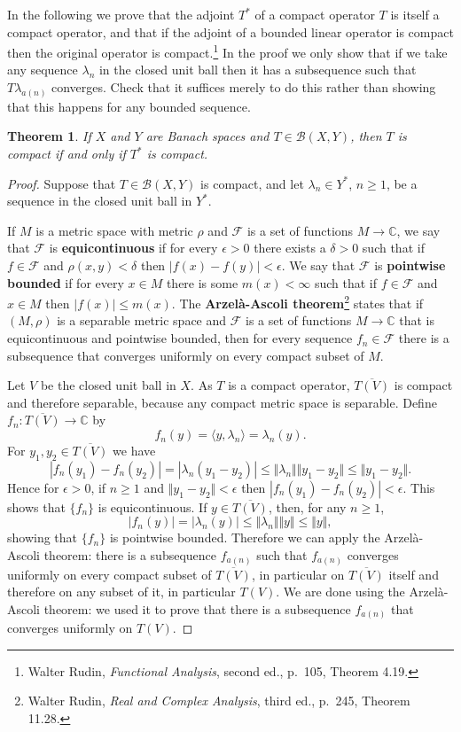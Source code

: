 \documentclass{article}
\newcommand{\inner}[2]{\langle #1, #2 \rangle}
\newcommand{\norm}[1]{\Vert #1 \Vert}
\newtheorem{theorem}{Theorem}
\begin{document}
In the following we prove that the adjoint $T^*$ of a compact operator $T$ is itself a compact operator,
and that if the adjoint of a bounded linear operator is compact then the original operator  is compact.\footnote{Walter Rudin, {\em Functional Analysis}, second ed., p.~105, Theorem 4.19.}
In the proof we only show that if we take any sequence $\lambda_n$ in the closed unit ball then it has a subsequence such that
$T\lambda_{a(n)}$ converges. Check that it suffices merely to do this rather than showing that this happens for any bounded sequence.

\begin{theorem}
If $X$ and $Y$ are Banach spaces and $T \in \mathscr{B}(X,Y)$, then $T$ is compact if and only if
$T^*$ is compact.
\label{adjointcompact}
\end{theorem}
\begin{proof}
Suppose that $T \in \mathscr{B}(X,Y)$ is compact, and let $\lambda_n \in Y^*$, $n \geq 1$, be a sequence in the closed unit ball in $Y^*$.

If $M$ is a metric space with metric $\rho$ and $\mathcal{F}$ is a set of functions $M \to \mathbb{C}$,
we say that $\mathcal{F}$ is \textbf{equicontinuous} if for every $\epsilon>0$ there exists a $\delta>0$ such that
if $f \in \mathcal{F}$ and $\rho(x,y)<\delta$ then $|f(x)-f(y)|<\epsilon$.
We say that $\mathcal{F}$ is \textbf{pointwise bounded} if for every $x \in M$ there is some $m(x)<\infty$ such that
if $f \in \mathcal{F}$ and $x \in M$ then $|f(x)| \leq m(x)$.
The \textbf{Arzel\`a-Ascoli theorem}\footnote{Walter Rudin, {\em Real and Complex Analysis}, third ed., p.~245, Theorem 11.28.}
 states that if $(M,\rho)$ is a separable metric space and $\mathcal{F}$ is a set of functions $M \to \mathbb{C}$ that is equicontinuous and pointwise bounded,
then for every sequence $f_n \in \mathcal{F}$ there is a subsequence that converges uniformly on every compact subset of $M$.

Let $V$ be the closed unit ball in $X$.
As $T$ is a compact operator, $\overline{T(V)}$ is compact and therefore separable, because any compact
metric space is separable. 
Define $f_n:\overline{T(V)} \to \mathbb{C}$ by 
\[
f_n(y) = \inner{y}{\lambda_n} = \lambda_n(y).
\]
For $y_1,y_2 \in \overline{T(V)}$ we have
\[
|f_n(y_1)-f_n(y_2)| = |\lambda_n(y_1-y_2)| \leq \norm{\lambda_n} \norm{y_1-y_2} \leq \norm{y_1-y_2}.
\]
Hence for $\epsilon>0$, if $n \geq 1$ and $\norm{y_1-y_2} < \epsilon$ then $|f_n(y_1)-f_n(y_2)|<\epsilon$. This shows
that $\{f_n\}$ is equicontinuous. If $y \in \overline{T(V)}$, then, for any $n \geq 1$,
\[
|f_n(y)| = |\lambda_n(y)| \leq \norm{\lambda_n} \norm{y} \leq \norm{y},
\]
showing that $\{f_n\}$ is pointwise bounded. Therefore we can apply the Arzel\`a-Ascoli theorem: there is a subsequence
$f_{a(n)}$ such that $f_{a(n)}$ converges uniformly on every compact subset of $\overline{T(V)}$, in particular on
$\overline{T(V)}$ itself and therefore on any subset of it, in particular $T(V)$. We are done using the Arzel\`a-Ascoli theorem: we used it to prove that there is a subsequence
$f_{a(n)}$ that converges uniformly on $T(V)$.


\end{proof}
\end{document}
